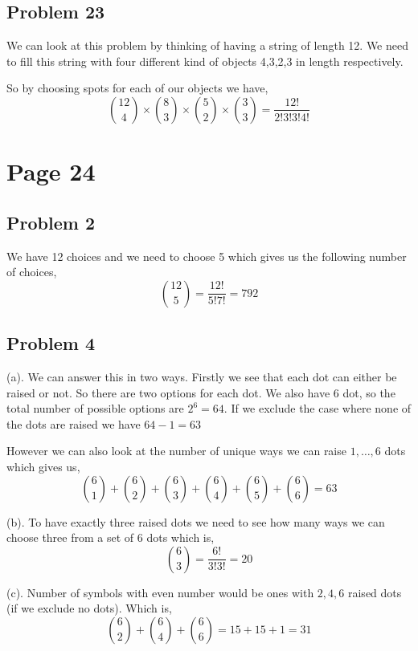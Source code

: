 \documentclass[a4paper]{report}
\begin{document}
\subsection*{Problem 23}
We can look at this problem by thinking of having a string of length 12. We need to fill this string with four different kind of objects 4,3,2,3 in length respectively. 

So by choosing spots for each of our objects we have, 
$$ {12 \choose 4} \times {8 \choose 3} \times {5 \choose 2} \times{ 3 \choose 3} = \frac{12!}{2!3!3!4!} $$ 



\section*{Page 24}
\subsection*{Problem 2}
We have 12 choices and we need to choose 5 which gives us the following number of choices, 
$$ {12 \choose 5} = \frac{12!}{5!7!} = 792 $$ 

\subsection*{Problem 4}
(a). We can answer this in two ways. Firstly we see that each dot can either be raised or not. So there are two options for each dot. We also have 6 dot, so the total number of possible options are $2^{6} = 64$. If we exclude the case where none of the dots are raised we have $64 - 1  = 63$

However we can also look at the number of unique ways we can raise $1, \dots,6$ dots which gives us, 
$${6 \choose 1} + {6 \choose 2} + {6 \choose 3} + {6 \choose 4} + {6 \choose 5} + {6 \choose 6} = 63 $$


(b). To have exactly three raised dots we need to see how many ways we can choose three from a set of 6 dots which is, 
$$ {6 \choose 3} = \frac{6!}{3!3!} = 20 $$ 


(c). Number of symbols with even number would be ones with $2,4,6$ raised dots (if we exclude no dots). Which is, 
$${6 \choose 2} + {6 \choose 4} + {6 \choose 6} =  15 + 15 + 1 = 31 $$ 
\end{document}

